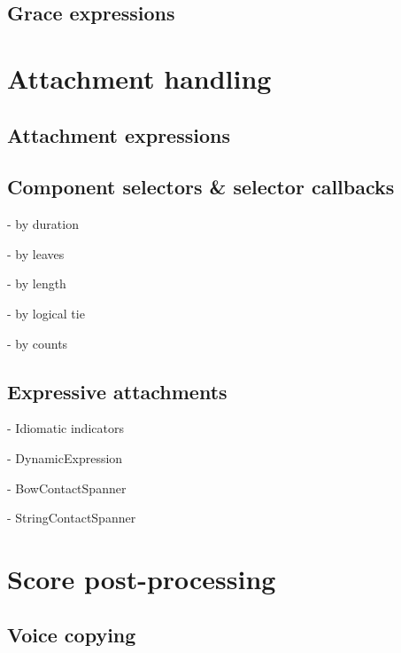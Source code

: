 \subsection{Grace expressions}

\section{Attachment handling}

\subsection{Attachment expressions}

\subsection{Component selectors \& selector callbacks}

- by duration

- by leaves

- by length

- by logical tie

- by counts

\subsection{Expressive attachments}

- Idiomatic indicators

- DynamicExpression

- BowContactSpanner

- StringContactSpanner

\section{Score post-processing}

\subsection{Voice copying}